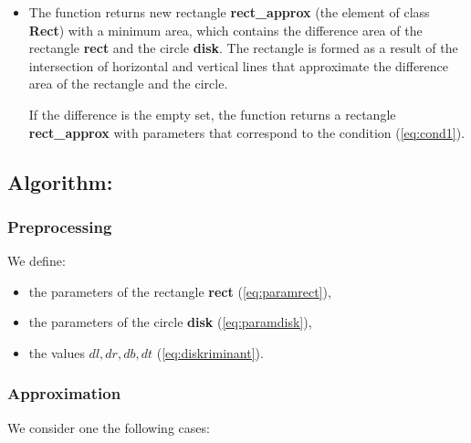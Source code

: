 \documentclass{report}
\begin{document}
\begin{itemize}
	\item The function returns new rectangle {\bfseries rect\_approx} (the element of class {\bfseries Rect}) with a minimum area, which contains the difference area of the rectangle {\bfseries rect} and the circle {\bfseries disk}. The rectangle is formed as a result of the intersection of horizontal and vertical lines that approximate the difference area of the rectangle and the circle.
	
	If the difference is the empty set, the function returns a rectangle {\bfseries rect\_approx} with parameters that correspond to the condition (\ref{eq:cond1}).
	
\end{itemize}

\subsection*{Algorithm:}

\subsubsection*{Preprocessing}

 We define:
 
 \begin{itemize}
 	
 	\item the parameters of the rectangle {\bfseries rect} (\ref{eq:paramrect}),
 	
 	\item the parameters of the circle {\bfseries disk} (\ref{eq:paramdisk}),
 	
 	\item the values $dl, dr, db, dt$ (\ref{eq:diskriminant}).
 		
 \end{itemize}

\subsubsection*{Approximation}

We consider one the following cases:
\end{document}

